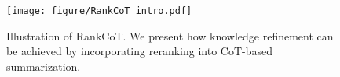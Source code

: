 \begin{figure}[t] 
\centering
    \texttt{[image: figure/RankCoT\_intro.pdf]}
    \caption{Illustration of RankCoT. We present how knowledge refinement can be achieved by incorporating reranking into CoT-based summarization.} \label{fig:RankCoT_intro}
\end{figure}